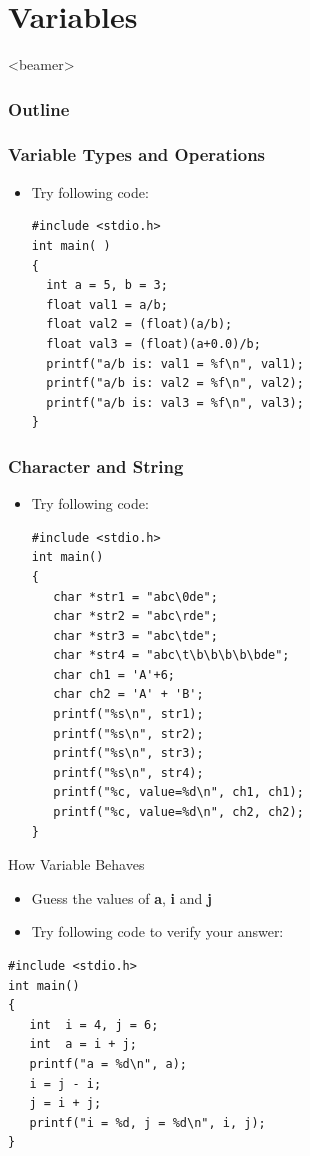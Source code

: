 \section{Variables}
\label{sec:var}
\begin{frame}<beamer>
    \frametitle{Outline}
    \tableofcontents[currentsection]
\end{frame}

\begin{frame}[fragile]
\frametitle{Variable Types and Operations}
\begin{itemize}
	\item {Try following code:}
\begin{lstlisting}[xleftmargin=0.05\linewidth, linewidth=0.9\linewidth]
#include <stdio.h>
int main( )
{
  int a = 5, b = 3;
  float val1 = a/b;
  float val2 = (float)(a/b);
  float val3 = (float)(a+0.0)/b;
  printf("a/b is: val1 = %f\n", val1);
  printf("a/b is: val2 = %f\n", val2);
  printf("a/b is: val3 = %f\n", val3);
}
\end{lstlisting}
\end{itemize}
\end{frame}

\begin{frame}[fragile]
\frametitle{Character and String}
\vspace{-0.14in}
\begin{itemize}
	\item {Try following code:}
\begin{lstlisting}[xleftmargin=0.05\linewidth, linewidth=0.9\linewidth]
#include <stdio.h>
int main()
{
   char *str1 = "abc\0de";
   char *str2 = "abc\rde";
   char *str3 = "abc\tde";
   char *str4 = "abc\t\b\b\b\b\bde";
   char ch1 = 'A'+6;
   char ch2 = 'A' + 'B';
   printf("%s\n", str1);
   printf("%s\n", str2);
   printf("%s\n", str3);
   printf("%s\n", str4);
   printf("%c, value=%d\n", ch1, ch1);
   printf("%c, value=%d\n", ch2, ch2);
}
\end{lstlisting}
\end{itemize}
\end{frame}

\begin{frame}[fragile]{How Variable Behaves}
\begin{itemize}
	\item {Guess the values of \textbf{a}, \textbf{i} and \textbf{j}}
	\item {Try following code to verify your answer:}
\end{itemize}

\begin{lstlisting}
#include <stdio.h>
int main()
{
   int  i = 4, j = 6;
   int  a = i + j;
   printf("a = %d\n", a);
   i = j - i; 
   j = i + j;
   printf("i = %d, j = %d\n", i, j);
}
\end{lstlisting}
\end{frame}

